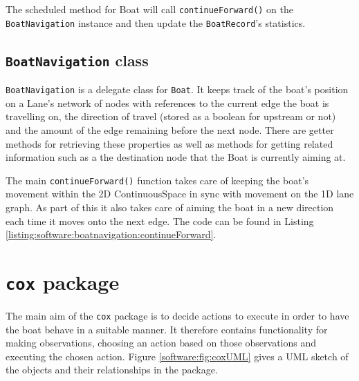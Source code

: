 The scheduled method for Boat will call \texttt{continueForward()} on the
\texttt{BoatNavigation} instance and then update the \texttt{BoatRecord}'s statistics.

\subsection{\texttt{BoatNavigation} class}

\texttt{BoatNavigation} is a delegate class for \texttt{Boat}. It keeps track of the
boat's position on a Lane's network of nodes with references to the
current edge the boat is travelling on, the direction of travel
(stored as a boolean for upstream or not) and the amount of the edge
remaining before the next node. There are getter methods for
retrieving these properties as well as methods for getting related
information such as a the destination node that the Boat is currently
aiming at.

The main \texttt{continueForward()} function takes care of keeping the
boat's movement within the 2D ContinuousSpace in sync with
movement on the 1D lane graph. As part of this it also takes care of
aiming the boat in a new direction each time it moves onto the next
edge. The code can be found in Listing \ref{listing:software:boatnavigation:continueForward}.



\section{\texttt{cox} package}

The main aim of the \texttt{cox} package is to decide actions to execute in order to have the boat behave in a suitable manner. It therefore contains functionality for making observations, choosing an action based on those observations and executing the chosen action. Figure \ref{software:fig:coxUML} gives a UML sketch of the objects and their relationships in the package.

